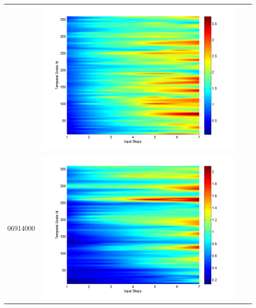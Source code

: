\documentclass[11pt]{article}
\begin{document}
\begin{table}[H]
{\begin{tabular}{c  c   c   c  }
&\begin{minipage}{.3\textwidth}\includegraphics[width=\linewidth]{resultgraph/06892000pepq.png}\end{minipage}
\\
06914000&\begin{minipage}{.3\textwidth}\includegraphics[width=\linewidth]{resultgraph/06914000p.png}\end{minipage} 

\end{tabular}}
\end{table}
\end{document}
